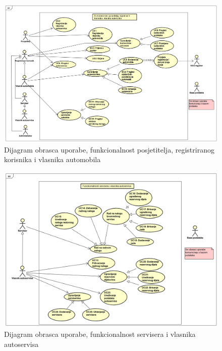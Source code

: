 					\begin{figure}[H]
						\includegraphics[width=\linewidth]{dijagrami/diagram0.png}
						\centering
						\caption{Dijagram obrasca uporabe, funkcionalnost posjetitelja, registriranog korisnika i vlasnika automobila}
						\label{fig:diagram0}
					\end{figure}
				
					\begin{figure}[H]
						\includegraphics[width=\linewidth]{dijagrami/diagram1.png}
						\centering
						\caption{Dijagram obrasca uporabe, funkcionalnost servisera i vlasnika autoservisa}
						\label{fig:diagram1}
					\end{figure}
				

